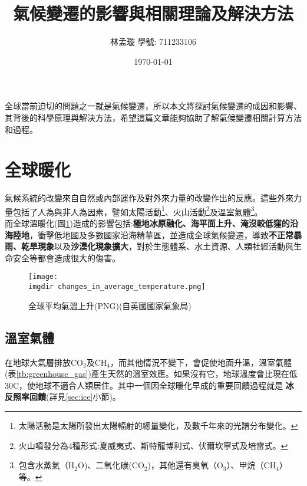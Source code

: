 \documentclass[12pt, a4paper]{article}
\title{ 氣候變遷的影響與相關理論及解決方法 }
\author{{\SM 林孟璇 \;\; 學號\;: \small 711233106 }}
\date{{\TT \today}}
\begin{document}
\maketitle
\fontsize{12}{22 pt}\selectfont


全球當前迫切的問題之一就是氣候變遷，所以本文將探討氣候變遷的成因和影響、其背後的科學原理與解決方法，希望這篇文章能夠協助了解氣候變遷相關計算方法和過程。


\section{全球暖化}
氣候系統的改變來自自然或內部運作及對外來力量的改變作出的反應。這些外來力量包括了人為與非人為因素，譬如太陽活動\footnote{太陽活動是太陽所發出太陽輻射的總量變化，及數千年來的光譜分布變化。}、火山活動\footnote{火山噴發分為4種形式:夏威夷式、斯特龍博利式、伏爾坎寧式及培雷式。}及溫室氣體\footnote{包含水蒸氣（$\mathrm{H_{2}O}$)、二氧化碳($\mathrm{CO_{2}}$)，其他還有臭氧（$\mathrm{O_{3}}$）、甲烷（$\mathrm{CH_{4}}$）等。}。\\
而全球溫暖化(圖\ref{fig:changes_in_average_temperature})造成的影響包括:\textbf{極地冰原融化、海平面上升、淹沒較低窪的沿海陸地}，衝擊低地國及多數國家沿海精華區，並造成全球氣候變遷，導致\textbf{不正常暴雨、乾旱現象}以及\textbf{沙漠化現象擴大}，對於生態體系、水土資源、人類社經活動與生命安全等都會造成很大的傷害。

\begin{figure}[h]
  \centering
  \texttt{[image: \\imgdir changes\_in\_average\_temperature.png]}
  \caption{全球平均氣溫上升(PNG)(自英國國家氣象局)}\label{fig:changes_in_average_temperature}\hspace{1.5cm}
\end{figure}



\subsection{溫室氣體}

在地球大氣層排放$\mathrm{CO_{2}}$及$\mathrm{CH_{4}}$，而其他情況不變下，會促使地面升溫，溫室氣體(表\ref{tb:greenhouse_gas})產生天然的溫室效應。如果沒有它，地球溫度會比現在低30\degree C，使地球不適合人類居住。其中一個因全球暖化早成的重要回饋過程就是\textbf{ \textcolor{coolblue}{冰反照率回饋}}(詳見\ref{sec:ice}小節)。
\end{document}
